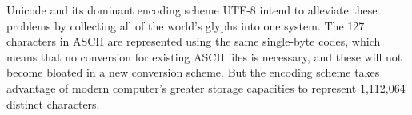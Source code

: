 Unicode and its dominant encoding scheme UTF-8 intend to alleviate these
problems by collecting all of the world's glyphs into one system. The 127
characters in ASCII are represented using the same single-byte codes, which
means that no conversion for existing ASCII files is necessary, and these will
not become bloated in a new conversion scheme. But the encoding scheme takes
advantage of modern computer's greater storage capacities to represent 1,112,064
distinct characters. 
